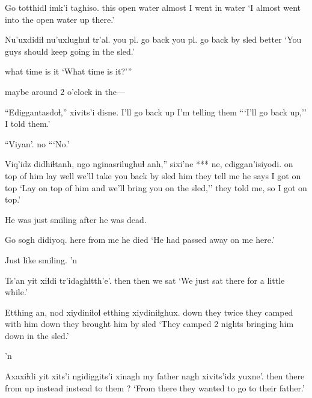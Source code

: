 \documentclass[12pt]{article}
\begin{document}
\gll Go totthidl imk'i taghiso.
this {open water} almost {I went in water}
\glt `I almost went into the open water up there.'
\glend

\gll Nu'uxdidiɬ nu'uxlughuɬ     tr'al.
{you pl. go back}         {you pl. go back by sled}  better
\glt `You guys should keep going in the sled.'
\glend

{{what time is it}}
\glt `What time is it?'''
\glend

maybe around 2 o'clock in the---

\gll ``Ediggantasdoɬ,'' {xivits'i disne}.
{I'll go back up} {I'm telling them}
\glt ```I'll go back up,'' I told them.'
\glend

\gll ``Viyan'.
no
\glt ```No.'
\glend

\gll Viq'idz       didhiɬtanh, ngo nginasrilughuɬ anh,'' sixi'ne         ***      ne,      ediggan'isiyodi. 
{on top of him} lay well {we'll take you back by sled} him {they tell me} {} {he says} {I got on top}
\glt `Lay on top of him and we'll bring you on the sled,'' they told me, so I got on top.'
\glend


He was just smiling after he was dead.

\gll Go sogh didiyoq.
here {from me} {he died}
\glt `He had passed away on me here.'
\glend

Just like smiling. 'n

\gll Ts'an {yit xiɬdi} tr'idaghɬtth'e'.
then        then     {we sat}     
\glt `We just sat there for a little while.'
\glend

\gll Etthing an, nod xiydiniɬoɬ etthing xiydiniɬghux.
down they twice {they camped with him}        down    {they brought him by sled}
\glt `They camped 2 nights bringing him down in the sled.' 
\glend

'n

\gll Axaxiɬdi yit xits'i ngidiggits'i xinagh {my father} nagh xivits'idz yuxne'.
then     there from up       instead  {}         instead       {to them}  ?
\glt `From there they wanted to go to their father.'
\glend
\end{document}
